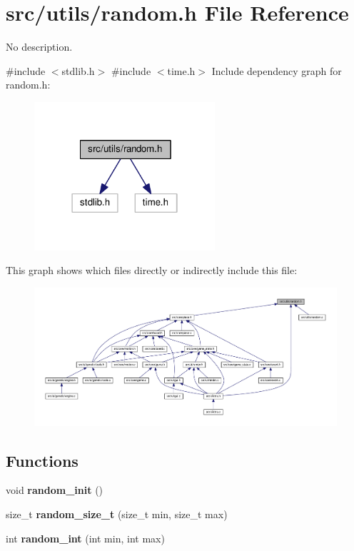 \section{src/utils/random.h File Reference}
\label{random_8h}


No description.  


{\ttfamily \#include $<$stdlib.\+h$>$}\newline
{\ttfamily \#include $<$time.\+h$>$}\newline
Include dependency graph for random.\+h\+:
\nopagebreak
\begin{figure}[H]
\begin{center}
\leavevmode
\includegraphics[width=190pt]{random_8h__incl}
\end{center}
\end{figure}
This graph shows which files directly or indirectly include this file\+:
\nopagebreak
\begin{figure}[H]
\begin{center}
\leavevmode
\includegraphics[width=350pt]{random_8h__dep__incl}
\end{center}
\end{figure}
\subsection*{Functions}
\begin{DoxyCompactItemize}
\item 
void \textbf{ random\+\_\+init} ()
\item 
size\+\_\+t \textbf{ random\+\_\+size\+\_\+t} (size\+\_\+t min, size\+\_\+t max)
\item 
int \textbf{ random\+\_\+int} (int min, int max)
\end{DoxyCompactItemize}


